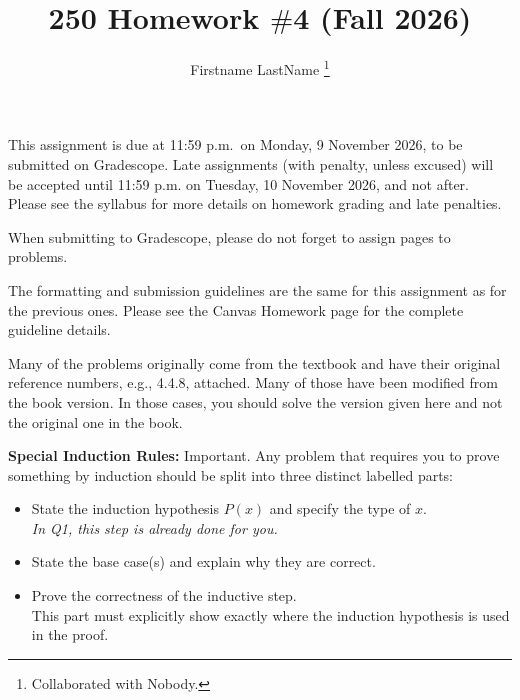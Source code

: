 \documentclass[12pt]{article}
\title{250 Homework $\#$4 (Fall  2026)}
\author{Firstname LastName \footnote{Collaborated with Nobody.}}
\begin{document}
\date{}
\maketitle


 This assignment is due at 11:59 p.m.~on  Monday,  9   November 2026, to 
be submitted on Gradescope.  Late assignments (with penalty, unless
excused) will be accepted until
11:59 p.m. on Tuesday,  10 November   2026, and not after.  Please see
the syllabus for more details on homework grading and late penalties.

\medskip

When submitting to Gradescope, please do not forget to assign pages to problems.



\bigskip


The formatting and submission guidelines are the same for this assignment as for the previous ones.  
Please see the Canvas Homework page for the complete  guideline details.




\medskip


 Many of the problems originally come from the textbook and have their original reference numbers, e.g., 4.4.8, attached.   Many of those  have been modified from the book version. In those cases, you should solve the version given here and not the original one in the book.  







\medskip

{\bf Special Induction Rules:} Important. Any problem that requires you   to prove something by induction should be split into three distinct labelled parts:

\begin{itemize}
\item [(i)] State the induction hypothesis $P(x)$ and specify the type of $x.$\\
{\em \small In Q1, this step is already done for you.}

 \item [(ii)] State the  base case(s) and explain why they are correct.

 \item [(iii)] Prove the correctness of the inductive step.\\
    This part  must explicitly show exactly where the induction hypothesis is used in the proof.

\end{itemize}
\end{document}
